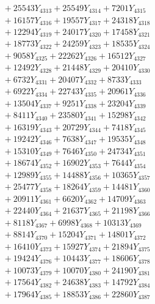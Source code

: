 \documentclass[a4paper,10pt]{article}
\begin{document}
{\begin{align}
&\;  + 25543 Y_{4313} + 25549 Y_{4314} + 7201 Y_{4315} \\[0.3ex]
&\;  + 16157 Y_{4316} + 19557 Y_{4317} + 24318 Y_{4318} \\[0.5ex]\allowbreak
&\;  + 12294 Y_{4319} + 24017 Y_{4320} + 17458 Y_{4321} \\[0.3ex]
&\;  + 18773 Y_{4322} + 24259 Y_{4323} + 18535 Y_{4324} \\[0.3ex]
&\;  + 9058 Y_{4325} + 22262 Y_{4326} + 16512 Y_{4327} \\[0.3ex]
&\;  + 12492 Y_{4328} + 21448 Y_{4329} + 20410 Y_{4330} \\[0.3ex]
&\;  + 6732 Y_{4331} + 20407 Y_{4332} + 8733 Y_{4333} \\[0.3ex]
&\;  + 6922 Y_{4334} + 22743 Y_{4335} + 20961 Y_{4336} \\[0.3ex]
&\;  + 13504 Y_{4337} + 9251 Y_{4338} + 23204 Y_{4339} \\[0.3ex]
&\;  + 8411 Y_{4340} + 23580 Y_{4341} + 15298 Y_{4342} \\[0.3ex]
&\;  + 16319 Y_{4343} + 20729 Y_{4344} + 7418 Y_{4345} \\[0.3ex]
&\;  + 19242 Y_{4346} + 7638 Y_{4347} + 19535 Y_{4348} \\[0.5ex]\allowbreak
&\;  + 15310 Y_{4349} + 7646 Y_{4350} + 24734 Y_{4351} \\[0.3ex]
&\;  + 18674 Y_{4352} + 16902 Y_{4353} + 7644 Y_{4354} \\[0.3ex]
&\;  + 12989 Y_{4355} + 14488 Y_{4356} + 10365 Y_{4357} \\[0.3ex]
&\;  + 25477 Y_{4358} + 18264 Y_{4359} + 14481 Y_{4360} \\[0.3ex]
&\;  + 20911 Y_{4361} + 6620 Y_{4362} + 14709 Y_{4363} \\[0.3ex]
&\;  + 22440 Y_{4364} + 21637 Y_{4365} + 21198 Y_{4366} \\[0.3ex]
&\;  + 8118 Y_{4367} + 6998 Y_{4368} + 10313 Y_{4369} \\[0.3ex]
&\;  + 8814 Y_{4370} + 15204 Y_{4371} + 14801 Y_{4372} \\[0.3ex]
&\;  + 16410 Y_{4373} + 15927 Y_{4374} + 21894 Y_{4375} \\[0.3ex]
&\;  + 19424 Y_{4376} + 10443 Y_{4377} + 18606 Y_{4378} \\[0.5ex]\allowbreak
&\;  + 10073 Y_{4379} + 10070 Y_{4380} + 24190 Y_{4381} \\[0.3ex]
&\;  + 17564 Y_{4382} + 24638 Y_{4383} + 14792 Y_{4384} \\[0.3ex]
&\;  + 17964 Y_{4385} + 18853 Y_{4386} + 22860 Y_{4387} \\[0.3ex]

\end{align}}
\end{document}

